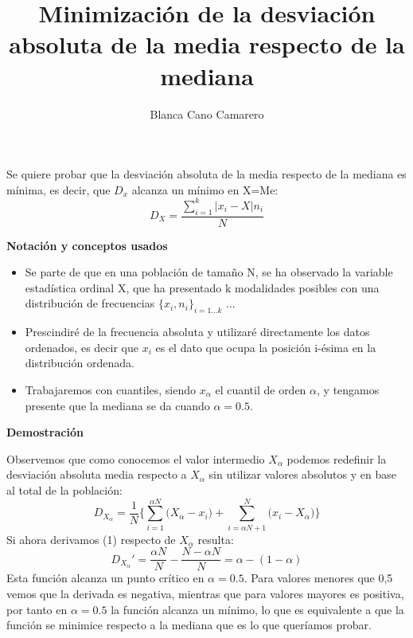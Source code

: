 \documentclass[a4paper , 11pt, spanish ]{article}
\title{Minimización de la desviación absoluta de la media respecto de la mediana}
\author{Blanca Cano Camarero}
\begin{document}
\maketitle
Se quiere probar que la desviación absoluta de la media respecto de la mediana es mínima, es decir, que $D_x$ alcanza un mínimo en X=Me:  
$$ D_{X} = \frac{\sum_{i = 1}^{k} |x_i - X| n_i}{N}$$ 

\textbf{Notación y conceptos usados } 
\par
\begin{itemize} 
	\item Se parte de que en una población de tamaño N, se ha observado la variable estadística ordinal X, que ha presentado k modalidades posibles con una distribución de frecuencias $\{x_i , n_i\}_{i=1...k}$ ...
	\item Prescindiré de la frecuencia absoluta y utilizaré directamente los datos ordenados, es decir que $x_i$ es el dato que ocupa la posición i-ésima en la distribución ordenada.
	\item Trabajaremos con cuantiles, siendo $x_\alpha$ el cuantil de orden $\alpha$, y tengamos presente que la mediana se da cuando $\alpha = 0.5 $.
	
\end{itemize}
\textbf{Demostración}
\par
Observemos que como conocemos el valor intermedio $X_\alpha$ podemos redefinir la desviación absoluta media respecto a $X_\alpha$ sin utilizar valores absolutos y en base al total de la población: 
\begin{equation}
	D_{X_\alpha} = \frac{1}{N}\Big\{ \sum_{i=1}^{\alpha N} \big(  X_\alpha - x_i \big) +  \sum_{i=\alpha N+1}^{N} \big( x_i - X_\alpha\big) \Big\}
\end{equation}
Si ahora derivamos (1) respecto de $ X_\alpha$    resulta:
$$ D_{X_\alpha}' = \frac{\alpha N}{N} - \frac{N- \alpha N}{N} = \alpha - (1-\alpha )$$
Esta función alcanza un punto crítico en $\alpha = 0.5 $. Para valores menores que 0,5 vemos que la derivada es negativa, mientras que para valores mayores es positiva, por tanto en $\alpha = 0.5 $ la función alcanza un mínimo, lo que es equivalente a que la función se minimice respecto a la mediana que es lo que queríamos probar. 
\end{document}
